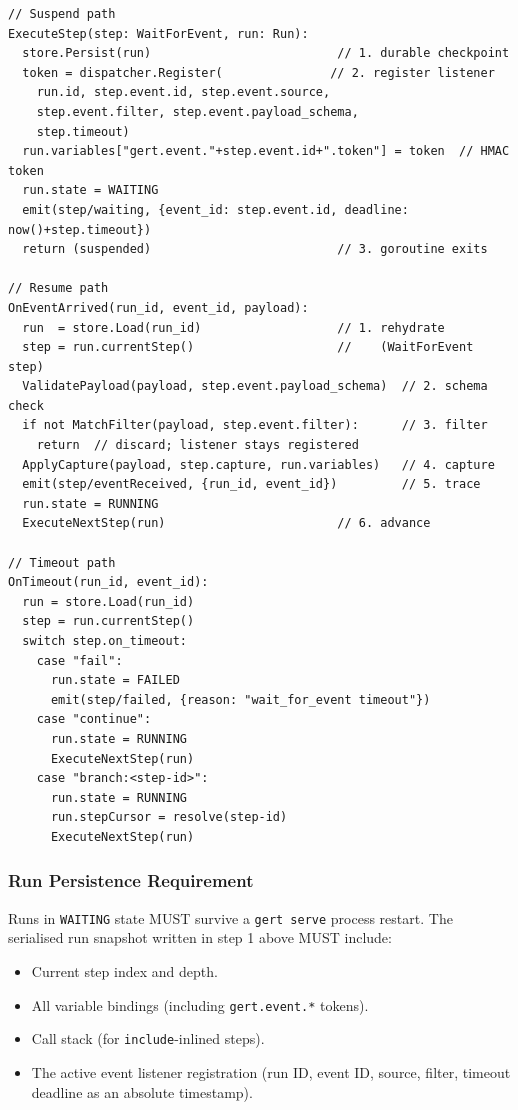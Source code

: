 \begin{verbatim}
// Suspend path
ExecuteStep(step: WaitForEvent, run: Run):
  store.Persist(run)                          // 1. durable checkpoint
  token = dispatcher.Register(               // 2. register listener
    run.id, step.event.id, step.event.source,
    step.event.filter, step.event.payload_schema,
    step.timeout)
  run.variables["gert.event."+step.event.id+".token"] = token  // HMAC token
  run.state = WAITING
  emit(step/waiting, {event_id: step.event.id, deadline: now()+step.timeout})
  return (suspended)                          // 3. goroutine exits

// Resume path
OnEventArrived(run_id, event_id, payload):
  run  = store.Load(run_id)                   // 1. rehydrate
  step = run.currentStep()                    //    (WaitForEvent step)
  ValidatePayload(payload, step.event.payload_schema)  // 2. schema check
  if not MatchFilter(payload, step.event.filter):      // 3. filter
    return  // discard; listener stays registered
  ApplyCapture(payload, step.capture, run.variables)   // 4. capture
  emit(step/eventReceived, {run_id, event_id})         // 5. trace
  run.state = RUNNING
  ExecuteNextStep(run)                        // 6. advance

// Timeout path
OnTimeout(run_id, event_id):
  run = store.Load(run_id)
  step = run.currentStep()
  switch step.on_timeout:
    case "fail":
      run.state = FAILED
      emit(step/failed, {reason: "wait_for_event timeout"})
    case "continue":
      run.state = RUNNING
      ExecuteNextStep(run)
    case "branch:<step-id>":
      run.state = RUNNING
      run.stepCursor = resolve(step-id)
      ExecuteNextStep(run)
\end{verbatim}

\subsubsection*{Run Persistence Requirement}

Runs in \texttt{WAITING} state MUST survive a \texttt{gert serve} process restart. The
serialised run snapshot written in step 1 above MUST include:

\begin{itemize}
  \item Current step index and depth.
  \item All variable bindings (including \texttt{gert.event.*} tokens).
  \item Call stack (for \texttt{include}-inlined steps).
  \item The active event listener registration (run ID, event ID, source, filter, timeout
        deadline as an absolute timestamp).
\end{itemize}

